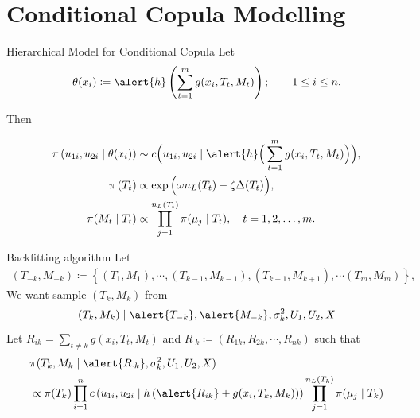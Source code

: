 \documentclass[11pt]{beamer}
\begin{document}
\fi

    \section{Conditional Copula Modelling}

    \begin{frame}{Hierarchical Model for Conditional Copula}
    Let
    \[
    \theta(x_i) \coloneqq \alert{h}\left( \sum_{t=1}^m g(x_i, T_t, M_t) \right); \qquad 1 \le i \le n.
    \]
    
    
    Then
    
    \begin{align}\label{eq:bayes:hier}
    \begin{split}
    \pi\left(u_{1i}, u_{2i} \mid \theta(x_i)\right) &\sim c\Big(u_{1i}, u_{2i} \mid \alert{h}\Big( \sum_{t=1}^m g(x_i, T_t, M_t) \Big)\Big),\\
    \pi\left(T_t\right) &\propto \exp\Big(\omega n_L(T_t) - \zeta \Delta(T_t)\Big),\\
    \pi(M_t \mid T_t) &\propto \prod_{j=1}^{n_L(T_t)} \pi(\mu_j \mid T_t), \quad t=1,2,\dots,m.
    \end{split}
    \end{align}
    
    \end{frame}
\iftrue
    \begin{frame}[shrink=10]{Backfitting algorithm}
    Let 
\begin{align*}
	(T_{-k},M_{-k})\coloneq \left\{(T_1,M_1),\cdots,(T_{k-1},M_{k-1}),(T_{k+1},M_{k+1}),\cdots(T_m,M_m)\right\},
\end{align*}
We want sample $(T_k, M_k)$ from 
\begin{equation*}
	(T_k,M_k)\mid \alert{T_{-k}},\alert{M_{-k}}, \sigma^2_{k}, U_1, U_2, X
\end{equation*}
Let $R_{ik} = \sum_{t\not=k}g(x_i, T_t, M_t)$ and $R_{\cdot k}\coloneqq(R_{1k},R_{2k},\cdots,R_{nk})$ such that
\begin{align}\label{eq:post:res}
	\begin{split}
		&\pi(T_k,M_k \mid \alert{R_{\cdot k}}, \sigma^2_{k}, U_1,U_2, X) \\
        &\propto \pi(T_k)\prod_{i=1}^{n}c\left(u_{1i},u_{2i}\mid h\left(\alert{R_{ik}}+g(x_i, T_k, M_k)\right)\right)\prod_{j=1}^{n_L(T_k)}\pi(\mu_j\mid T_k)
	\end{split}
\end{align}
\end{frame}
\fi
\end{document}

